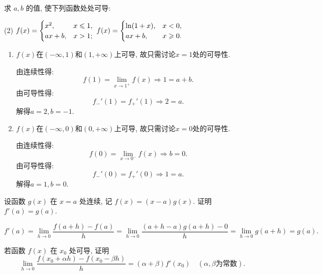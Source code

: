 \begin{exercise}[3.1.2]
    求 $a,b$ 的值, 使下列函数处处可导:
    \begin{tasks}[label=(\arabic*)](2)
        \task $f(x) = \begin{cases} x^2, & x \leqslant 1, \\ ax+b, & x > 1; \end{cases}$
        \task $f(x) = \begin{cases} \ln(1+x), & x < 0, \\ ax+b, & x \geqslant 0. \end{cases}$
    \end{tasks}
\end{exercise}

\begin{solution}
    \begin{enumerate}
        \item $f(x)$在$(-\infty,1)$和$(1,+\infty)$上可导, 故只需讨论$x=1$处的可导性.

              由连续性得:
              $$  f(1) = \lim_{x \to 1^+} f(x) \Rightarrow 1 = a+b. $$
              由可导性得:
              $$ f_-'(1) = f_+'(1) \Rightarrow 2 = a. $$
              解得$a=2,b=-1$.
        \item $f(x)$在$(-\infty,0)$和$(0,+\infty)$上可导, 故只需讨论$x=0$处的可导性.

              由连续性得:
              $$ f(0) = \lim_{x \to 0^-} f(x) \Rightarrow b = 0. $$
              由可导性得:
              $$ f_-'(0) = f_+'(0) \Rightarrow 1 = a. $$
              解得$a=1,b=0$.
    \end{enumerate}
\end{solution}

\begin{exercise}[3.1.3]
    设函数 $g(x)$ 在 $x=a$ 处连续, 记 $f(x) = (x-a)g(x)$. 证明 $f'(a)=g(a)$.
\end{exercise}

\begin{solution}
    $$f'(a) = \lim_{h \to 0} \frac{f(a+h)-f(a)}{h} = \lim_{h \to 0} \frac{(a+h-a)g(a+h)-0}{h} = \lim_{h \to 0} g(a+h) = g(a).$$
\end{solution}

\begin{exercise}[3.1.4]
    若函数 $f(x)$ 在 $x_0$ 处可导, 证明
    $$ \lim_{h \to 0} \frac{f(x_0+\alpha h) - f(x_0-\beta h)}{h} = (\alpha+\beta)f'(x_0) \quad (\alpha, \beta \text{为常数}). $$
\end{exercise}

